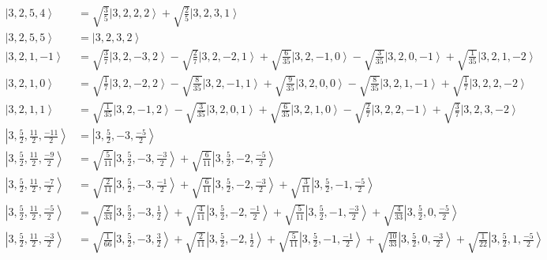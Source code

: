 \documentclass{report}
\newcommand{\ket}[1]{\left| #1 \right>} %
\begin{document}
\begin{align*}
\ket{ 3 ,  2 ,  5 ,  4  } &=  \sqrt{  \frac{3}{5}  } \ket{ 3 ,  2 ,  2 ,  2  } + \sqrt{  \frac{2}{5}  } \ket{ 3 ,  2 ,  3 ,  1  } \\
\ket{ 3 ,  2 ,  5 ,  5  } &=  \ket{ 3 ,  2 ,  3 ,  2  } \\
\ket{ 3 ,  2 ,  1 ,  -1  } &=  \sqrt{  \frac{3}{7}  } \ket{ 3 ,  2 ,  -3 ,  2  } - \sqrt{  \frac{2}{7}  } \ket{ 3 ,  2 ,  -2 ,  1  } + \sqrt{  \frac{6}{35}  } \ket{ 3 ,  2 ,  -1 ,  0  } - \sqrt{  \frac{3}{35}  } \ket{ 3 ,  2 ,  0 ,  -1  } + \sqrt{  \frac{1}{35}  } \ket{ 3 ,  2 ,  1 ,  -2  } \\
\ket{ 3 ,  2 ,  1 ,  0  } &=  \sqrt{  \frac{1}{7}  } \ket{ 3 ,  2 ,  -2 ,  2  } - \sqrt{  \frac{8}{35}  } \ket{ 3 ,  2 ,  -1 ,  1  } + \sqrt{  \frac{9}{35}  } \ket{ 3 ,  2 ,  0 ,  0  } - \sqrt{  \frac{8}{35}  } \ket{ 3 ,  2 ,  1 ,  -1  } + \sqrt{  \frac{1}{7}  } \ket{ 3 ,  2 ,  2 ,  -2  } \\
\ket{ 3 ,  2 ,  1 ,  1  } &=  \sqrt{  \frac{1}{35}  } \ket{ 3 ,  2 ,  -1 ,  2  } - \sqrt{  \frac{3}{35}  } \ket{ 3 ,  2 ,  0 ,  1  } + \sqrt{  \frac{6}{35}  } \ket{ 3 ,  2 ,  1 ,  0  } - \sqrt{  \frac{2}{7}  } \ket{ 3 ,  2 ,  2 ,  -1  } + \sqrt{  \frac{3}{7}  } \ket{ 3 ,  2 ,  3 ,  -2  } \\
\ket{ 3 ,  \frac{5}{2} ,  \frac{11}{2} ,  \frac{-11}{2}  } &=  \ket{ 3 ,  \frac{5}{2} ,  -3 ,  \frac{-5}{2}  } \\
\ket{ 3 ,  \frac{5}{2} ,  \frac{11}{2} ,  \frac{-9}{2}  } &=  \sqrt{  \frac{5}{11}  } \ket{ 3 ,  \frac{5}{2} ,  -3 ,  \frac{-3}{2}  } + \sqrt{  \frac{6}{11}  } \ket{ 3 ,  \frac{5}{2} ,  -2 ,  \frac{-5}{2}  } \\
\ket{ 3 ,  \frac{5}{2} ,  \frac{11}{2} ,  \frac{-7}{2}  } &=  \sqrt{  \frac{2}{11}  } \ket{ 3 ,  \frac{5}{2} ,  -3 ,  \frac{-1}{2}  } + \sqrt{  \frac{6}{11}  } \ket{ 3 ,  \frac{5}{2} ,  -2 ,  \frac{-3}{2}  } + \sqrt{  \frac{3}{11}  } \ket{ 3 ,  \frac{5}{2} ,  -1 ,  \frac{-5}{2}  } \\
\ket{ 3 ,  \frac{5}{2} ,  \frac{11}{2} ,  \frac{-5}{2}  } &=  \sqrt{  \frac{2}{33}  } \ket{ 3 ,  \frac{5}{2} ,  -3 ,  \frac{1}{2}  } + \sqrt{  \frac{4}{11}  } \ket{ 3 ,  \frac{5}{2} ,  -2 ,  \frac{-1}{2}  } + \sqrt{  \frac{5}{11}  } \ket{ 3 ,  \frac{5}{2} ,  -1 ,  \frac{-3}{2}  } + \sqrt{  \frac{4}{33}  } \ket{ 3 ,  \frac{5}{2} ,  0 ,  \frac{-5}{2}  } \\
\ket{ 3 ,  \frac{5}{2} ,  \frac{11}{2} ,  \frac{-3}{2}  } &=  \sqrt{  \frac{1}{66}  } \ket{ 3 ,  \frac{5}{2} ,  -3 ,  \frac{3}{2}  } + \sqrt{  \frac{2}{11}  } \ket{ 3 ,  \frac{5}{2} ,  -2 ,  \frac{1}{2}  } + \sqrt{  \frac{5}{11}  } \ket{ 3 ,  \frac{5}{2} ,  -1 ,  \frac{-1}{2}  } + \sqrt{  \frac{10}{33}  } \ket{ 3 ,  \frac{5}{2} ,  0 ,  \frac{-3}{2}  } + \sqrt{  \frac{1}{22}  } \ket{ 3 ,  \frac{5}{2} ,  1 ,  \frac{-5}{2}  } \\

\end{align*}
\end{document}
